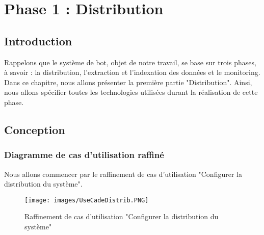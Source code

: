 \chapter{Phase 1 : Distribution}

\section*{Introduction}

Rappelons que le système de bot, objet de notre travail, se base sur trois phases, à savoir : la distribution, l'extraction et l'indexation des données et le monitoring. Dans ce chapitre, nous allons présenter la première partie "Distribution". Ainsi, nous allons spécifier toutes les technologies utilisées durant la réalisation de cette phase. 

\section{Conception}
\subsection{Diagramme de cas d'utilisation raffiné}
Nous allons commencer par le raffinement de cas d'utilisation "Configurer la distribution du système".
\begin{figure}[H]
\centering
\texttt{[image: images/UseCadeDistrib.PNG]}
\caption{Raffinement de cas d'utilisation "Configurer la distribution du système"}
\end{figure}
